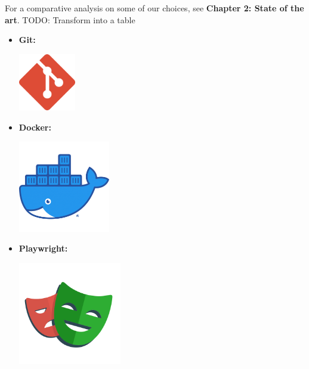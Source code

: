 \medskip
For a comparative analysis on some of our choices, see \textbf {Chapter 2: State of the art}.
TODO: Transform into a table

\begin{itemize}
    \item \textbf{Git:} \newline
          \begin{minipage}{\linewidth}
              \centering
              \includegraphics[width=2.5cm]{src/assets/logos/git_512x512.png}
          \end{minipage}
    \item \textbf{Docker:} \newline
          \begin{minipage}{\linewidth}
              \centering
              \includegraphics[width=4cm]{src/assets/logos/docker_512x512.png}
          \end{minipage}
    \item \textbf{Playwright:} \newline
          \begin{minipage}{\linewidth}
              \centering
              \includegraphics[width=4.5cm]{src/assets/logos/playwright_512x512.png}
          \end{minipage}


\end{itemize}
